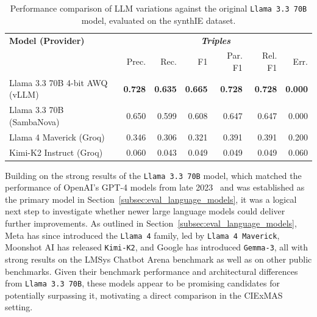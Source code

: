 \documentclass[a4paper,oneside,bibliography=totoc]{scrbook}
\begin{document}
\begin{table}[h]
  \centering
  \begin{tabular}{p{5cm}|rrrrrr}
    \toprule
    \textbf{Model (Provider)}      & \multicolumn{6}{c}{\textit{\textbf{Triples}}}                                                                                      \\
                                   & Prec.                                         & Rec.           & F1             & Par. F1        & Rel. F1        & Err.           \\
    \midrule
    Llama 3.3 70B 4-bit AWQ (vLLM) & \textbf{0.728}                                & \textbf{0.635} & \textbf{0.665} & \textbf{0.728} & \textbf{0.728} & \textbf{0.000} \\
    Llama 3.3 70B (SambaNova)      & 0.650                                         & 0.599          & 0.608          & 0.647          & 0.647          & 0.000          \\
    Llama 4 Maverick (Groq)        & 0.346                                         & 0.306          & 0.321          & 0.391          & 0.391          & 0.200          \\
    Kimi-K2 Instruct (Groq)        & 0.060                                         & 0.043          & 0.049          & 0.049          & 0.049          & 0.060          \\
    \bottomrule
  \end{tabular}
  \caption{Performance comparison of \ac{LLM} variations against the original \texttt{Llama 3.3 70B} model, evaluated on the synthIE dataset.}
  \label{tab:model_variation_comparison}
\end{table}

Building on the strong results of the \texttt{Llama 3.3 70B} model, which matched the performance of OpenAI's GPT-4 models from late 2023~\cite{Chiang2024} and was established as the primary model in Section~\ref{subsec:eval_language_models}, it was a logical next step to investigate whether newer large language models could deliver further improvements. As outlined in Section~\ref{subsec:eval_language_models}, Meta has since introduced the \texttt{Llama 4} family, led by \texttt{Llama 4 Maverick}, Moonshot AI has released \texttt{Kimi-K2}, and Google has introduced \texttt{Gemma-3}, all with strong results on the LMSys Chatbot Arena benchmark as well as on other public benchmarks. Given their benchmark performance and architectural differences from \texttt{Llama 3.3 70B}, these models appear to be promising candidates for potentially surpassing it, motivating a direct comparison in the CIExMAS setting.
\end{document}
